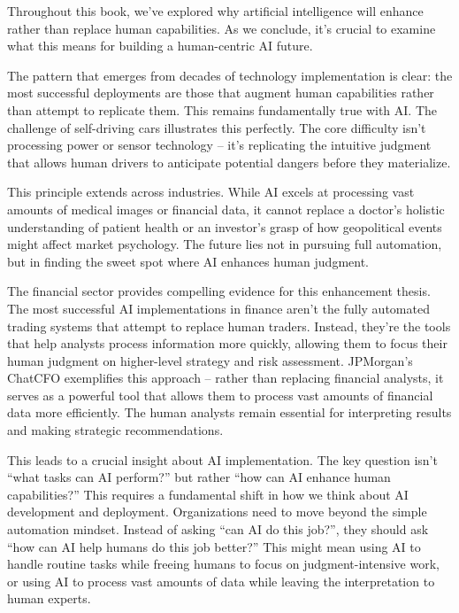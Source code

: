 \documentclass[
  Letterpaper,
]{scrbook}
\begin{document}

Throughout this book, we've explored why artificial intelligence will
enhance rather than replace human capabilities. As we conclude, it's
crucial to examine what this means for building a human-centric AI
future.

The pattern that emerges from decades of technology implementation is
clear: the most successful deployments are those that augment human
capabilities rather than attempt to replicate them. This remains
fundamentally true with AI. The challenge of self-driving cars
illustrates this perfectly. The core difficulty isn't processing power
or sensor technology -- it's replicating the intuitive judgment that
allows human drivers to anticipate potential dangers before they
materialize.

This principle extends across industries. While AI excels at processing
vast amounts of medical images or financial data, it cannot replace a
doctor's holistic understanding of patient health or an investor's grasp
of how geopolitical events might affect market psychology. The future
lies not in pursuing full automation, but in finding the sweet spot
where AI enhances human judgment.

The financial sector provides compelling evidence for this enhancement
thesis. The most successful AI implementations in finance aren't the
fully automated trading systems that attempt to replace human traders.
Instead, they're the tools that help analysts process information more
quickly, allowing them to focus their human judgment on higher-level
strategy and risk assessment. JPMorgan's ChatCFO exemplifies this
approach -- rather than replacing financial analysts, it serves as a
powerful tool that allows them to process vast amounts of financial data
more efficiently. The human analysts remain essential for interpreting
results and making strategic recommendations.

This leads to a crucial insight about AI implementation. The key
question isn't ``what tasks can AI perform?'' but rather ``how can AI
enhance human capabilities?'' This requires a fundamental shift in how
we think about AI development and deployment. Organizations need to move
beyond the simple automation mindset. Instead of asking ``can AI do this
job?'', they should ask ``how can AI help humans do this job better?''
This might mean using AI to handle routine tasks while freeing humans to
focus on judgment-intensive work, or using AI to process vast amounts of
data while leaving the interpretation to human experts.
\end{document}
